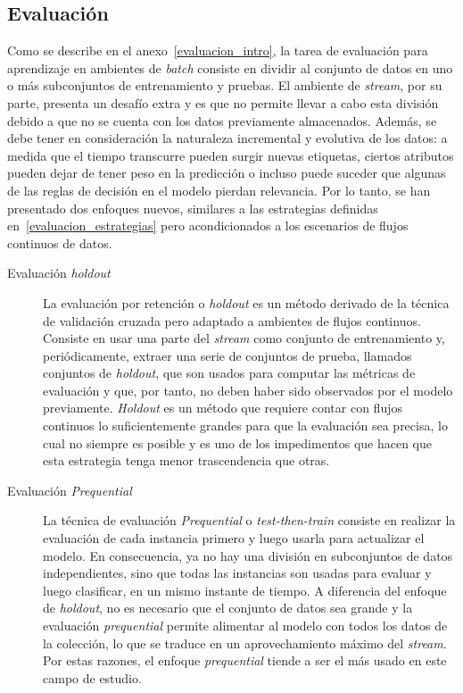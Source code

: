 \subsection{Evaluación}
\label{stream_evaluacion}

Como se describe en el anexo~\ref{evaluacion_intro}, la tarea de evaluación para
aprendizaje en ambientes de \textit{batch} consiste en dividir al conjunto de
datos en uno o más subconjuntos de entrenamiento y pruebas.  El ambiente de
\textit{stream}, por su parte, presenta un desafío extra y es que no permite
llevar a cabo esta división debido a que no se cuenta con los datos previamente
almacenados. Además, se debe tener en consideración la naturaleza incremental y
evolutiva de los datos: a medida que el tiempo transcurre pueden surgir nuevas
etiquetas, ciertos atributos pueden dejar de tener peso en la predicción o
incluso puede suceder que algunas de las reglas de decisión en el modelo pierdan
relevancia. Por lo tanto, se han presentado dos enfoques nuevos, similares a las
estrategias definidas en~\ref{evaluacion_estrategias} pero acondicionados a los
escenarios de flujos continuos de datos.

\begin{description}

	\item[Evaluación \textit{holdout}] La evaluación por retención o
	      \textit{holdout} es un método derivado de la técnica de validación cruzada
	      pero adaptado a ambientes de flujos continuos. Consiste en usar una parte
	      del \textit{stream} como conjunto de entrenamiento y, periódicamente,
	      extraer una serie de conjuntos de prueba, llamados conjuntos de
	      \textit{holdout}, que son usados para computar las métricas de evaluación
	      y que, por tanto, no deben haber sido observados por el modelo
	      previamente.  \textit{Holdout} es un método que requiere contar con flujos
	      continuos lo suficientemente grandes para que la evaluación sea precisa,
	      lo cual no siempre es posible y es uno de los impedimentos que hacen que
	      esta estrategia tenga menor trascendencia que otras.

	\item[Evaluación \textit{Prequential}] La técnica de evaluación
	      \textit{Prequential} o \textit{test-then-train} consiste en realizar la
	      evaluación de cada instancia primero y luego usarla para actualizar el
	      modelo. En consecuencia, ya no hay una división en subconjuntos de datos
	      independientes, sino que todas las instancias son usadas para evaluar y
	      luego clasificar, en un mismo instante de tiempo. A diferencia del enfoque
	      de \textit{holdout}, no es necesario que el conjunto de datos sea grande y
	      la evaluación \textit{prequential} permite alimentar al modelo con todos
	      los datos de la colección, lo que se traduce en un aprovechamiento máximo
	      del \textit{stream}. Por estas razones, el enfoque \textit{prequential}
	      tiende a ser el más usado en este campo de estudio.

\end{description}

